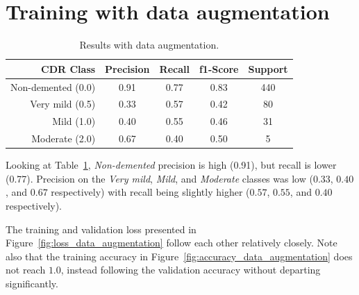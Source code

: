 \documentclass{kththesis}
\begin{document}
\section{Training with data augmentation}

\begin{table}[H]
  \begin{center}
    \caption{Results with data augmentation. \label{tab:results_data_augmentation}}
    \begin{tabular}{r|ccc|c}
      \textbf{CDR Class} & \textbf{Precision} & \textbf{Recall} & \textbf{f1-Score} & \textbf{Support} \\
      \toprule
           Non-demented (0.0) &  0.91   &  0.77  &   0.83   &   440 \\
           Very mild (0.5) &  0.33   &  0.57  &   0.42   &    80 \\
           Mild (1.0)         &  0.40   &  0.55  &   0.46   &    31 \\
           Moderate (2.0)     &  0.67   &  0.40  &   0.50   &     5 \\
    \end{tabular}
  \end{center}
\end{table}

Looking at Table~\ref{tab:results_data_augmentation}, \textit{Non-demented} precision is high (0.91), but recall is lower (0.77). Precision on the \textit{Very mild}, \textit{Mild}, and \textit{Moderate} classes was low ($0.33$, $0.40$, and $0.67$ respectively) with recall being slightly higher ($0.57$, $0.55$, and $0.40$ respectively).

The training and validation loss presented in Figure~\ref{fig:loss_data_augmentation} follow each other relatively closely. Note also that the training accuracy in Figure~\ref{fig:accuracy_data_augmentation} does not reach $1.0$, instead following the validation accuracy without departing significantly.
\newpage
\end{document}
